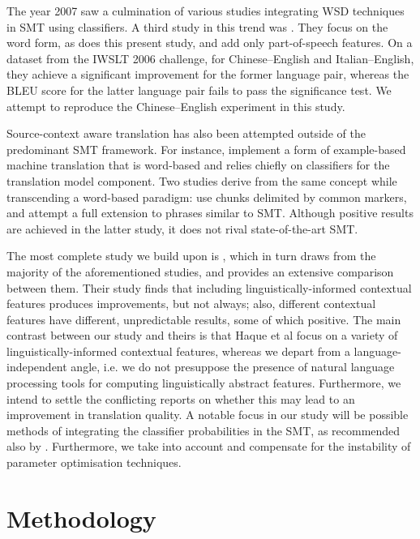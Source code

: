 The year 2007 saw a culmination of various studies integrating WSD techniques
in SMT using classifiers. A third study in this trend was \cite{Stroppa+07}.
They focus on the word form, as does this present study, and add only
part-of-speech features. On a dataset from the IWSLT 2006 challenge, for
Chinese--English and Italian--English, they achieve a significant improvement
for the former language pair, whereas the BLEU score for the latter language
pair fails to pass the significance test. We attempt to reproduce the
Chinese--English experiment in this study.

Source-context aware translation has also been attempted outside of the
predominant SMT framework. For instance, \cite{MBMT} implement a
form of example-based machine translation that is word-based and relies
chiefly on classifiers for the translation model component. Two studies derive
from the same concept while transcending a word-based paradigm:
\cite{MARKERBASED} use chunks delimited by common markers, and \cite{PBMBMT}
attempt a full extension to phrases similar to SMT. Although positive results
are achieved in the latter study, it does not rival state-of-the-art SMT.

The most complete study we build upon is \cite{Rejwanul+11}, which in turn
draws from the majority of the aforementioned studies, and provides an
extensive comparison between them. Their study finds that including
linguistically-informed contextual features produces improvements, but not
always; also, different contextual features have different, unpredictable
results, some of which positive. The main contrast between our study and theirs
is that Haque et al focus on a variety of linguistically-informed contextual
features, whereas we depart from a language-independent angle, i.e. we do not
presuppose the presence of natural language processing tools for computing
linguistically abstract features. Furthermore, we intend to settle the
conflicting reports on whether this may lead to an improvement in translation
quality. A notable focus in our study will be possible methods of integrating
the classifier probabilities in the SMT, as recommended also by
\cite{Gimenez+07}. Furthermore, we take into account and compensate for the
instability of parameter optimisation techniques.


\section{Methodology}
\label{sec:methodology}

